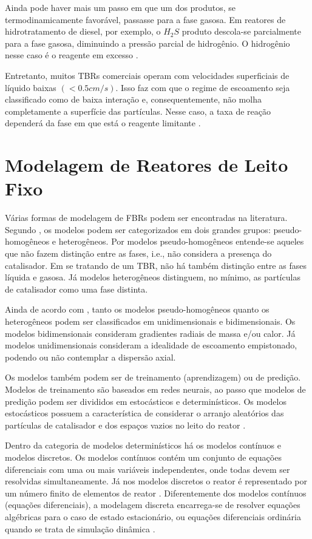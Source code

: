 Ainda pode haver mais um passo em que um dos produtos, se termodinamicamente
favorável, passasse para a fase gasosa. Em reatores de hidrotratamento de
diesel, por exemplo, o $H_2S$ produto descola-se parcialmente para a fase
gasosa, diminuindo a pressão parcial de hidrogênio. O hidrogênio nesse caso é
o reagente em excesso \cite{Ancheyta2011}.

Entretanto, muitos TBRs comerciais operam com velocidades superficiais de
líquido baixas $(<0.5 cm/s)$. Isso faz com que o regime de escoamento seja
classificado como de baixa interação e, consequentemente, não molha
completamente a superfície das partículas. Nesse caso, a taxa de reação
dependerá da fase em que está o reagente limitante \cite{Ranade2011}.

\section {Modelagem de Reatores de Leito Fixo} \label{sec:modelagemreatores}

Várias formas de modelagem de FBRs podem ser encontradas na literatura.
Segundo , os modelos podem ser categorizados em dois
grandes grupos: pseudo-homogêneos e heterogêneos. Por modelos pseudo-homogêneos
entende-se aqueles que não fazem distinção entre as fases, i.e., não considera a
presença do catalisador. Em se tratando de um TBR, não há também distinção entre
as fases líquida e gasosa. Já modelos heterogêneos distinguem, no mínimo, as
partículas de catalisador como uma fase distinta.

Ainda de acordo com , tanto os modelos pseudo-homogêneos
quanto os heterogêneos podem ser classificados em unidimensionais e
bidimensionais. Os modelos bidimensionais consideram gradientes radiais de massa
e/ou calor. Já modelos unidimensionais consideram a idealidade de escoamento
empistonado, podendo ou não contemplar a dispersão axial.

Os modelos também podem ser de treinamento (aprendizagem) ou de predição.
Modelos de treinamento são baseados em redes neurais, ao passo que modelos de
predição podem ser divididos em estocásticos e determinísticos. Os modelos
estocásticos possuem a característica de considerar o arranjo aleatórios das
partículas de catalisador e dos espaços vazios no leito do reator
\cite{Ancheyta2011}. 

Dentro da categoria de modelos determinísticos há os modelos contínuos e modelos
discretos. Os modelos contínuos contém um conjunto de equações diferenciais com
uma ou mais variáveis independentes, onde todas devem ser resolvidas
simultaneamente. Já nos modelos discretos o reator é representado por um número
finito de elementos de reator \cite{Ancheyta2011}. Diferentemente dos modelos
contínuos (equações diferenciais), a modelagem discreta encarrega-se de resolver
equações algébricas para o caso de estado estacionário, ou equações diferenciais
ordinária quando se trata de simulação dinâmica \cite{Schnitzlein1987}.


